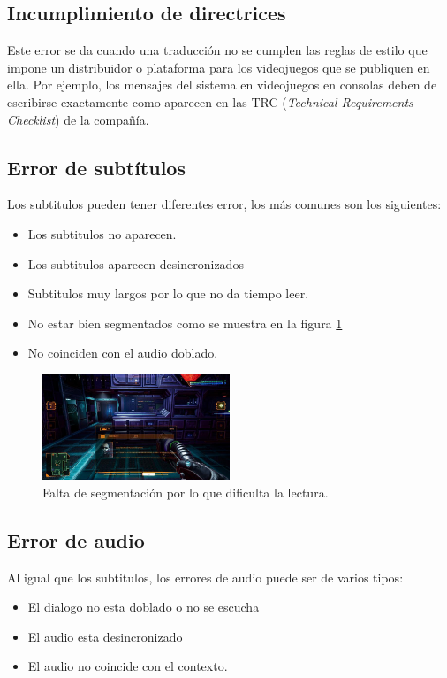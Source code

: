 \subsection{Incumplimiento de directrices}\label{ErrorDirectrices}
Este error se da cuando una traducción no se cumplen las reglas de estilo que
impone un distribuidor o plataforma para los videojuegos que se publiquen en ella.
Por ejemplo, los mensajes del sistema en videojuegos en consolas deben de escribirse
exactamente como aparecen en las TRC (\textit{Technical Requirements Checklist}) de la compañía.

\subsection{Error de subtítulos}\label{ErrorSubtitulos}
Los subtitulos pueden tener diferentes error, los más comunes son los siguientes:
\begin{itemize}
	\item Los subtitulos no aparecen.
	\item Los subtitulos aparecen desincronizados
	\item Subtitulos muy largos por lo que no da tiempo leer.
	\item No estar bien segmentados como se muestra en la figura \ref{fig:ESubtitulo}
	\item No coinciden con el audio doblado.
\end{itemize}
\begin{figure}[H]
	\centering
	\includegraphics[width = 0.5\textwidth]{Imagenes/Errores_Localizacion/E_Subtitulo.png}
	\caption{Falta de segmentación por lo que dificulta la lectura.}
	\label{fig:ESubtitulo}
\end{figure}
\subsection{Error de audio}\label{ErrorAudio}

Al igual que los subtitulos, los errores de audio puede ser de varios tipos:
\begin{itemize}
	\item El dialogo no esta doblado o no se escucha
	\item El audio esta desincronizado
	\item El audio no coincide con el contexto.
\end{itemize}

